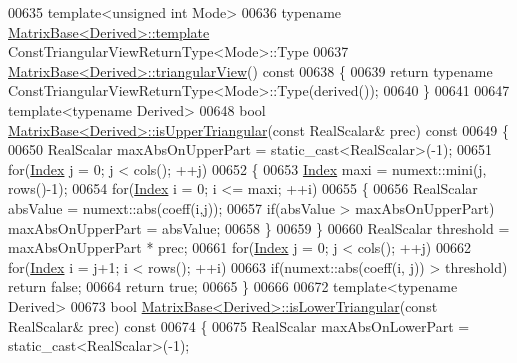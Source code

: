 \begin{DoxyCode}
00635 \textcolor{keyword}{template}<\textcolor{keywordtype}{unsigned} \textcolor{keywordtype}{int} Mode>
00636 \textcolor{keyword}{typename} \hyperlink{group___core___module_class_eigen_1_1_matrix_base}{MatrixBase<Derived>::template} 
      ConstTriangularViewReturnType<Mode>::Type
00637 \hyperlink{group___core___module_class_eigen_1_1_matrix_base}{MatrixBase<Derived>::triangularView}()\textcolor{keyword}{ const}
00638 \textcolor{keyword}{}\{
00639   \textcolor{keywordflow}{return} \textcolor{keyword}{typename} ConstTriangularViewReturnType<Mode>::Type(derived());
00640 \}
00641 
00647 \textcolor{keyword}{template}<\textcolor{keyword}{typename} Derived>
00648 \textcolor{keywordtype}{bool} \hyperlink{group___core___module_aae3ec1660bb4ac584220481c54ab4a64}{MatrixBase<Derived>::isUpperTriangular}(\textcolor{keyword}{const} RealScalar& prec)\textcolor{keyword}{
       const}
00649 \textcolor{keyword}{}\{
00650   RealScalar maxAbsOnUpperPart = \textcolor{keyword}{static\_cast<}RealScalar\textcolor{keyword}{>}(-1);
00651   \textcolor{keywordflow}{for}(\hyperlink{group___core___module_a554f30542cc2316add4b1ea0a492ff02}{Index} j = 0; j < cols(); ++j)
00652   \{
00653     \hyperlink{group___core___module_a554f30542cc2316add4b1ea0a492ff02}{Index} maxi = numext::mini(j, rows()-1);
00654     \textcolor{keywordflow}{for}(\hyperlink{group___core___module_a554f30542cc2316add4b1ea0a492ff02}{Index} i = 0; i <= maxi; ++i)
00655     \{
00656       RealScalar absValue = numext::abs(coeff(i,j));
00657       \textcolor{keywordflow}{if}(absValue > maxAbsOnUpperPart) maxAbsOnUpperPart = absValue;
00658     \}
00659   \}
00660   RealScalar threshold = maxAbsOnUpperPart * prec;
00661   \textcolor{keywordflow}{for}(\hyperlink{group___core___module_a554f30542cc2316add4b1ea0a492ff02}{Index} j = 0; j < cols(); ++j)
00662     \textcolor{keywordflow}{for}(\hyperlink{group___core___module_a554f30542cc2316add4b1ea0a492ff02}{Index} i = j+1; i < rows(); ++i)
00663       \textcolor{keywordflow}{if}(numext::abs(coeff(i, j)) > threshold) \textcolor{keywordflow}{return} \textcolor{keyword}{false};
00664   \textcolor{keywordflow}{return} \textcolor{keyword}{true};
00665 \}
00666 
00672 \textcolor{keyword}{template}<\textcolor{keyword}{typename} Derived>
00673 \textcolor{keywordtype}{bool} \hyperlink{group___core___module_a1e96c42d79a56f0a6ade30ce031e17eb}{MatrixBase<Derived>::isLowerTriangular}(\textcolor{keyword}{const} RealScalar& prec)\textcolor{keyword}{
       const}
00674 \textcolor{keyword}{}\{
00675   RealScalar maxAbsOnLowerPart = \textcolor{keyword}{static\_cast<}RealScalar\textcolor{keyword}{>}(-1);

\end{DoxyCode}
